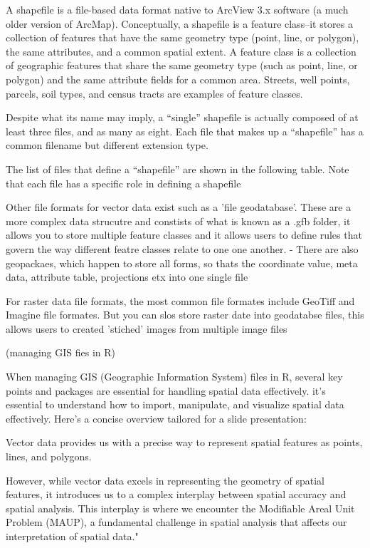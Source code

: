 \documentclass[12pt]{article}
\begin{document}
A shapefile is a file-based data format native to ArcView 3.x software (a much older version of ArcMap). Conceptually, a shapefile is a feature class–it stores a collection of features that have the same geometry type (point, line, or polygon), the same attributes, and a common spatial extent. A feature class is a collection of geographic features that share the same geometry type (such as point, line, or polygon) and the same attribute fields for a common area. Streets, well points, parcels, soil types, and census tracts are examples of feature classes.

Despite what its name may imply, a “single” shapefile is actually composed of at least three files, and as many as eight. Each file that makes up a “shapefile” has a common filename but different extension type.

The list of files that define a “shapefile” are shown in the following table. Note that each file has a specific role in defining a shapefile

Other file formats for vector data exist such as a 'file geodatabase'. These are a more complex data strucutre and constists of what is known as a .gfb folder, it allows you to store multiple feature classes and it allows users to define rules that govern the way different featre classes relate to one one another. 
- There are also geopackaes, which happen to store all forms, so thats the coordinate value, meta data, attribute table, projections etx into one single file 

For raster data file formats, the most common file formates include GeoTiff and Imagine file formates. But you can slos store raster date into geodatabse files, this allows users to created 'stiched' images from multiple image files


\subsectiom (managing GIS fies in R) 

When managing GIS (Geographic Information System) files in R, several key points and packages are essential for handling spatial data effectively.  it's essential to understand how to import, manipulate, and visualize spatial data effectively. Here's a concise overview tailored for a slide presentation:


Vector data provides us with a precise way to represent spatial features as points, lines, and polygons. 

However, while vector data excels in representing the geometry of spatial features, it introduces us to a complex interplay between spatial accuracy and spatial analysis. This interplay is where we encounter the Modifiable Areal Unit Problem (MAUP), a fundamental challenge in spatial analysis that affects our interpretation of spatial data."
\end{document}
